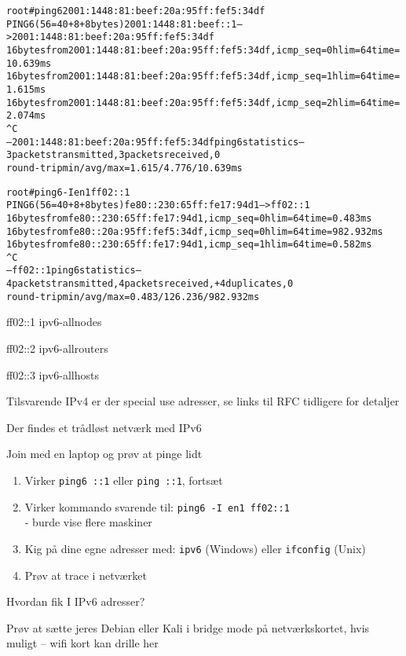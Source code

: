 \documentclass[Screen16to9,17pt]{foils}
\begin{document}
\begin{alltt}
\footnotesize
root# ping6 2001:1448:81:beef:20a:95ff:fef5:34df
PING6(56=40+8+8 bytes) 2001:1448:81:beef::1 --> 2001:1448:81:beef:20a:95ff:fef5:34df
16 bytes from 2001:1448:81:beef:20a:95ff:fef5:34df, icmp_seq=0 hlim=64 time=10.639 ms
16 bytes from 2001:1448:81:beef:20a:95ff:fef5:34df, icmp_seq=1 hlim=64 time=1.615 ms
16 bytes from 2001:1448:81:beef:20a:95ff:fef5:34df, icmp_seq=2 hlim=64 time=2.074 ms
^C
--- 2001:1448:81:beef:20a:95ff:fef5:34df ping6 statistics ---
3 packets transmitted, 3 packets received, 0% packet loss
round-trip min/avg/max = 1.615/4.776/10.639 ms
\end{alltt}



\begin{alltt}\footnotesize
root# ping6 -I en1 ff02::1
PING6(56=40+8+8 bytes) fe80::230:65ff:fe17:94d1 --> ff02::1
16 bytes from fe80::230:65ff:fe17:94d1, icmp_seq=0 hlim=64 time=0.483 ms
16 bytes from fe80::20a:95ff:fef5:34df, icmp_seq=0 hlim=64 time=982.932 ms
16 bytes from fe80::230:65ff:fe17:94d1, icmp_seq=1 hlim=64 time=0.582 ms
^C
--- ff02::1 ping6 statistics ---
4 packets transmitted, 4 packets received, +4 duplicates, 0% packet loss
round-trip min/avg/max = 0.483/126.236/982.932 ms
\end{alltt}

\begin{list2}
\item ff02::1         ipv6-allnodes
\item ff02::2         ipv6-allrouters
\item ff02::3         ipv6-allhosts
\end{list2}
Tilsvarende IPv4 er der special use adresser, se links til RFC tidligere for detaljer


\begin{list1}
\item Der findes et trådløst netværk med IPv6
\item Join med en laptop og prøv at pinge lidt
\begin{enumerate}
\item Virker \verb+ping6 ::1+ eller \verb+ping ::1+, fortsæt
\item Virker kommando svarende til: \verb+ping6 -I en1 ff02::1+\\
- burde vise flere maskiner
\item Kig på dine egne adresser med: \verb+ipv6+ (Windows) eller \verb+ifconfig+ (Unix)
\item Prøv at trace i netværket
\end{enumerate}
\item Hvordan fik I IPv6 adresser?
\item Prøv at sætte jeres Debian eller Kali i bridge mode på netværkskortet, hvis muligt -- wifi kort kan drille her
\end{list1}
\end{document}
